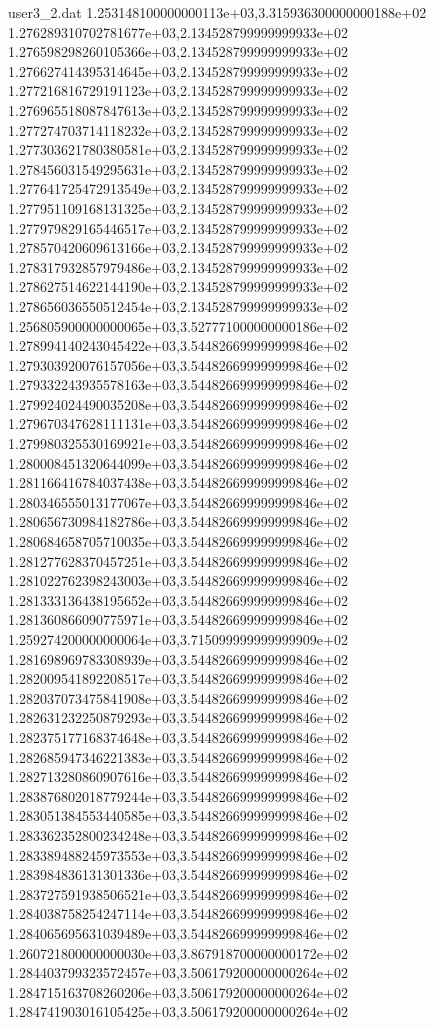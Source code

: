 \begin{filecontents}{user3_2.dat}
1.253148100000000113e+03,3.315936300000000188e+02
1.276289310702781677e+03,2.134528799999999933e+02
1.276598298260105366e+03,2.134528799999999933e+02
1.276627414395314645e+03,2.134528799999999933e+02
1.277216816729191123e+03,2.134528799999999933e+02
1.276965518087847613e+03,2.134528799999999933e+02
1.277274703714118232e+03,2.134528799999999933e+02
1.277303621780380581e+03,2.134528799999999933e+02
1.278456031549295631e+03,2.134528799999999933e+02
1.277641725472913549e+03,2.134528799999999933e+02
1.277951109168131325e+03,2.134528799999999933e+02
1.277979829165446517e+03,2.134528799999999933e+02
1.278570420609613166e+03,2.134528799999999933e+02
1.278317932857979486e+03,2.134528799999999933e+02
1.278627514622144190e+03,2.134528799999999933e+02
1.278656036550512454e+03,2.134528799999999933e+02
1.256805900000000065e+03,3.527771000000000186e+02
1.278994140243045422e+03,3.544826699999999846e+02
1.279303920076157056e+03,3.544826699999999846e+02
1.279332243935578163e+03,3.544826699999999846e+02
1.279924024490035208e+03,3.544826699999999846e+02
1.279670347628111131e+03,3.544826699999999846e+02
1.279980325530169921e+03,3.544826699999999846e+02
1.280008451320644099e+03,3.544826699999999846e+02
1.281166416784037438e+03,3.544826699999999846e+02
1.280346555013177067e+03,3.544826699999999846e+02
1.280656730984182786e+03,3.544826699999999846e+02
1.280684658705710035e+03,3.544826699999999846e+02
1.281277628370457251e+03,3.544826699999999846e+02
1.281022762398243003e+03,3.544826699999999846e+02
1.281333136438195652e+03,3.544826699999999846e+02
1.281360866090775971e+03,3.544826699999999846e+02
1.259274200000000064e+03,3.715099999999999909e+02
1.281698969783308939e+03,3.544826699999999846e+02
1.282009541892208517e+03,3.544826699999999846e+02
1.282037073475841908e+03,3.544826699999999846e+02
1.282631232250879293e+03,3.544826699999999846e+02
1.282375177168374648e+03,3.544826699999999846e+02
1.282685947346221383e+03,3.544826699999999846e+02
1.282713280860907616e+03,3.544826699999999846e+02
1.283876802018779244e+03,3.544826699999999846e+02
1.283051384553440585e+03,3.544826699999999846e+02
1.283362352800234248e+03,3.544826699999999846e+02
1.283389488245973553e+03,3.544826699999999846e+02
1.283984836131301336e+03,3.544826699999999846e+02
1.283727591938506521e+03,3.544826699999999846e+02
1.284038758254247114e+03,3.544826699999999846e+02
1.284065695631039489e+03,3.544826699999999846e+02
1.260721800000000030e+03,3.867918700000000172e+02
1.284403799323572457e+03,3.506179200000000264e+02
1.284715163708260206e+03,3.506179200000000264e+02
1.284741903016105425e+03,3.506179200000000264e+02

\end{filecontents}
